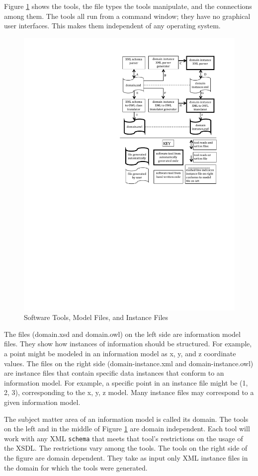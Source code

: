 \documentclass[preprint,12pt]{elsarticle}
\begin{document}
Figure \ref{flowchart} shows the tools, the file types the tools
manipulate, and the connections among them. The tools all run from a
command window; they have no graphical user interfaces. This makes them
independent of any operating system.

\begin{figure}
	\centering
	\includegraphics [width=0.8 \textwidth]{ConversionChart.pdf}
	\caption{Software Tools, Model Files, and Instance Files}
	\label{flowchart}
\end{figure}

The files (domain.xsd and domain.owl) on the left side are information
model files. They show how instances of information should be structured.
For example, a point might be modeled in an information model as x, y, and
z coordinate values. The files on the right side (domain-instance.xml and
domain-instance.owl) are instance files that contain specific data
instances that conform to an information model. For example, a specific
point in an instance file might be (1, 2, 3), corresponding to the x, y, z
model. Many instance files may correspond to a given information model.

The subject matter area of an information model is called its domain. The
tools on the left and in the middle of Figure \ref{flowchart} are domain
independent. Each tool will work with any XML {\tt schema} that meets that
tool's restrictions on the usage of the XSDL. The restrictions vary among
the tools. The tools on the right side of the figure are domain dependent.
They take as input only XML instance files in the domain for which the
tools were generated.
\end{document}
